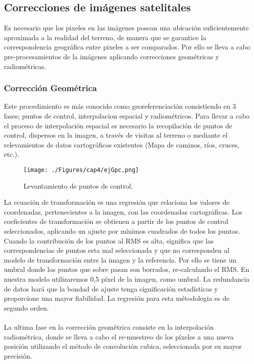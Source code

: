 \subsection{Correcciones de im\'agenes satelitales}\label{sec:coorImsat}
Es necesario que los pixeles en las im\'agenes posean una ubicaci\'on suficientemente aproximada a la realidad del terreno, de manera que se garantice la correspondencia geogr\'afica entre pixeles a ser comparados. Por ello se lleva a cabo pre-procesamientos de la im\'agenes aplicando correcciones geom\'etricas y radiom\'etricas.
\subsubsection{Correcci\'on Geom\'etrica}
Este procedimiento es m\'as conocido como georeferenciaci\'on consistiendo en 3 fases; puntos de control, interpolacion espacial y radiom\'etricos. Para llevar a cabo el proceso de interpolaci\'on espacial es necesario la recopilaci\'on de puntos de control, dispersos en la imagen, a trav\'es de visitas al terreno o mediante el relevamientos de datos cartogr\'aficos existentes (Mapa de caminos, ríos, cruces, etc.).
\begin{figure}[H]
	\centering
	\texttt{[image: ./Figures/cap4/ejGpc.png]}
	\caption{Levantamiento de puntos de control.}
	\label{fig:gcp}
\end{figure}

La ecuaci\'on de transformaci\'on es una regresi\'on que relaciona los valores de coordenadas, pertenecientes a la imagen, con las coordenadas cartogr\'aficas. Los coeficientes de transformaci\'on se obtienen a partir de los puntos de control seleccionados, aplicando un ajuste por m\'inimos cuadrados de todos los puntos. Cuando la contribuci\'on de los puntos al RMS es alta, significa que las correspondencias de puntos esta mal seleccionada y que no corresponden al modelo de transformaci\'on entre la imagen y la referencia. Por ello se tiene un umbral donde los puntos que sobre pasan son borrados, re-calculando el RMS. En nuestra modelo utilizaremos 0,5 p\'ixel de la imagen, como umbral. La redundancia de datos har\'a que la bondad de ajuste tenga significaci\'on estad\'isticas y proporcione una mayor fiabilidad. La regresi\'on para esta m\'etodologia es de segundo orden.\\~\\
La ultima fase en la correcci\'on geom\'etrica consiste en la interpolaci\'on radiom\'etrica, donde se lleva a cabo el re-muestreo de los p\'ixeles a una nueva posici\'on utilizando el m\'etodo de convoluci\'on cubica, seleccionada por su mayor precisi\'on.
